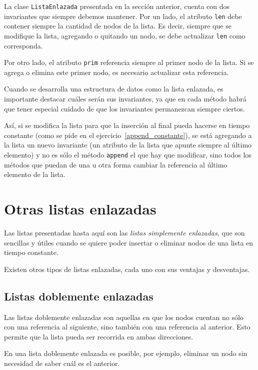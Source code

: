 La clase \lstinline!ListaEnlazada! presentada en la sección anterior,
cuenta con dos invariantes que siempre debemos mantener.  Por un lado, el
atributo \lstinline!len! debe contener siempre la cantidad de nodos de la
lista.  Es decir, siempre que se modifique la lista, agregando o quitando
un nodo, se debe actualizar \lstinline!len! como corresponda.

Por otro lado, el atributo \lstinline!prim! referencia siempre al primer
nodo de la lista. Si se agrega o elimina este primer nodo, es necesario
actualizar esta referencia.

Cuando se desarrolla una estructura de datos como la lista enlazada, es
importante destacar cuáles serán sus invariantes, ya que en cada método
habrá que tener especial cuidado de que los invariantes permanezcan siempre
ciertos.

Así, si se modifica la lista para que la inserción al final pueda hacerse en
tiempo constante (como se pide en el ejercicio~\ref{append_constante}),
se está agregando a la lista un nuevo invariante (un atributo de la lista
que apunte siempre al último elemento) y no es sólo el método
\lstinline!append! el que hay que modificar, sino todos los métodos que
puedan de una u otra forma cambiar la referencia al último elemento de la
lista.

\section{Otras listas enlazadas}

Las listas presentadas hasta aquí son las \emph{listas simplemente
enlazadas}, que son sencillas y útiles cuando se quiere poder insertar o
eliminar nodos de una lista en tiempo constante.

Existen otros tipos de listas enlazadas, cada uno con sus ventajas y
desventajas.

\subsection*{Listas doblemente enlazadas}

Las listas doblemente enlazadas son aquellas en que los nodos cuentan no
sólo con una referencia al siguiente, sino también con una referencia al
anterior.  Esto permite que la lista pueda ser recorrida en ambas
direcciones.

En una lista doblemente enlazada es posible, por ejemplo, eliminar un
nodo sin necesidad de saber cuál es el anterior.

